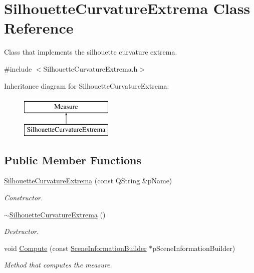 \hypertarget{class_silhouette_curvature_extrema}{\section{Silhouette\+Curvature\+Extrema Class Reference}
\label{class_silhouette_curvature_extrema}
}


Class that implements the silhouette curvature extrema.  




{\ttfamily \#include $<$Silhouette\+Curvature\+Extrema.\+h$>$}

Inheritance diagram for Silhouette\+Curvature\+Extrema\+:\begin{figure}[H]
\begin{center}
\leavevmode
\includegraphics[height=2.000000cm]{class_silhouette_curvature_extrema}
\end{center}
\end{figure}
\subsection*{Public Member Functions}
\begin{DoxyCompactItemize}
\item 
\hyperlink{class_silhouette_curvature_extrema_a510e8770286722f6794cf2bbc03dfd13}{Silhouette\+Curvature\+Extrema} (const Q\+String \&p\+Name)
\begin{DoxyCompactList}\small\item\em Constructor. \end{DoxyCompactList}\item 
\hyperlink{class_silhouette_curvature_extrema_a24e6c9cc85cc36377ecbc5d4f8609b44}{$\sim$\+Silhouette\+Curvature\+Extrema} ()
\begin{DoxyCompactList}\small\item\em Destructor. \end{DoxyCompactList}\item 
void \hyperlink{class_silhouette_curvature_extrema_a57dc216116f4f1687e326d67c9f144e6}{Compute} (const \hyperlink{class_scene_information_builder}{Scene\+Information\+Builder} $\ast$p\+Scene\+Information\+Builder)
\begin{DoxyCompactList}\small\item\em Method that computes the measure. \end{DoxyCompactList}\end{DoxyCompactItemize}
